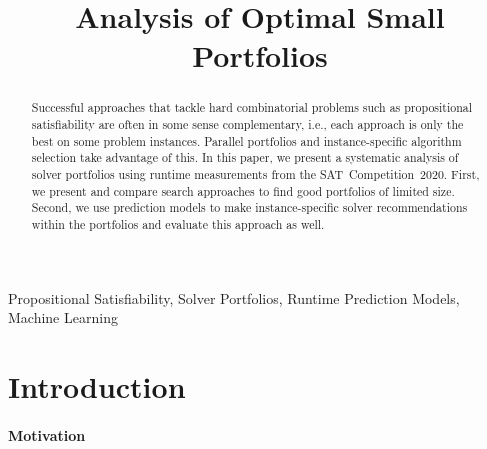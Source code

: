 \documentclass[conference]{IEEEtran}
\begin{document}
\title{Analysis of Optimal Small Portfolios}

\author{
\and
{}
}

\maketitle

\begin{abstract}
Successful approaches that tackle hard combinatorial problems such as propositional satisfiability are often in some sense complementary, i.e., each approach is only the best on some problem instances. 
Parallel portfolios and instance-specific algorithm selection take advantage of this. 
In this paper, we present a systematic analysis of solver portfolios using runtime measurements from the SAT~Competition~2020. 
First, we present and compare search approaches to find good portfolios of limited size.
Second, we use prediction models to make instance-specific solver recommendations within the portfolios and evaluate this approach as well.
\end{abstract}

\begin{IEEEkeywords}
Propositional Satisfiability, Solver Portfolios, Runtime Prediction Models, Machine Learning
\end{IEEEkeywords}

\section{Introduction}
\label{sec:introduction}

\paragraph{Motivation}
\end{document}
